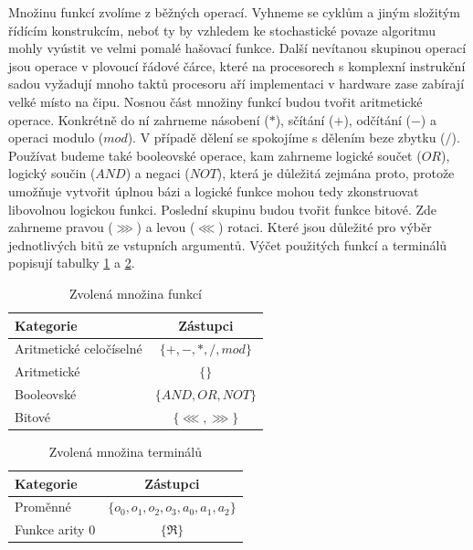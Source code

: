 Množinu funkcí zvolíme z běžných operací. Vyhneme se cyklům a jiným složitým
řídícím konstrukcím, neboť ty by vzhledem ke stochastické povaze algoritmu mohly
vyústit ve velmi pomalé hašovací funkce. Další nevítanou skupinou operací jsou operace
v plovoucí řádové čárce, které na procesorech s komplexní instrukční sadou vyžadují
mnoho taktů procesoru aří implementaci v hardware zase zabírají velké místo na čipu.
Nosnou část množiny funkcí budou tvořit aritmetické operace. Konkrétně do ní zahrneme
násobení ($*$), sčítání ($+$), odčítání ($-$) a operaci modulo ($mod$). V případě dělení
se spokojíme s dělením beze zbytku ($/$). Používat budeme také booleovské operace,
kam zahrneme logické součet ($OR$), logický součin ($AND$) a negaci ($NOT$), která 
je důležitá zejmána proto, protože umožňuje vytvořit úplnou bázi a logické funkce mohou
tedy zkonstruovat libovolnou logickou funkci. Poslední skupinu budou tvořit funkce bitové.
Zde zahrneme pravou ($\ggg$) a levou ($\lll$) rotaci. Které jsou důležité pro výběr 
jednotlivých bitů ze vstupních argumentů. Výčet použitých funkcí a terminálů
popisují tabulky \ref{tab:function_set_design} a \ref{tab:terminal_set_design}.

\begin{table}
\begin{center}
\begin{tabular}{ |l|c| }
	\hline
   	Kategorie & Zástupci \\
  	\hline
  	Aritmetické celočíselné  & $\{ +,-,*,/,mo	d \}$ \\
  	Aritmetické                     & $\{\}$ \\
  	Booleovské				      & $\{AND, OR, NOT\}$ \\
  	Bitové					          & $\{ \lll, \ggg \}$ \\ 	 
  	\hline
\end{tabular}
\caption{Zvolená množina funkcí}
\label{tab:function_set_design}
\end{center}
\end{table}

\begin{table}
\begin{center}
\begin{tabular}{ |l|c| }
	\hline
   	Kategorie & Zástupci \\
  	\hline
  	Proměnné       & $\{o_0, o_1, o_2, o_3, a_0, a_1, a_2\}$ \\
  	Funkce arity 0 & $\{ \Re \}$ \\	 
  	\hline
\end{tabular}
\caption{Zvolená množina terminálů}
\label{tab:terminal_set_design}
\end{center}
\end{table}

